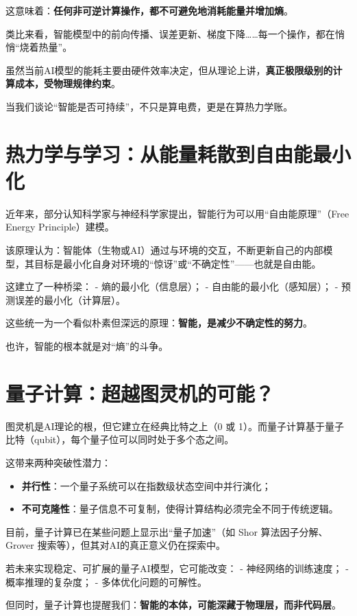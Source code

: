 这意味着：\textbf{任何非可逆计算操作，都不可避免地消耗能量并增加熵}。

类比来看，智能模型中的前向传播、误差更新、梯度下降……每一个操作，都在悄悄“烧着热量”。

虽然当前AI模型的能耗主要由硬件效率决定，但从理论上讲，\textbf{真正极限级别的计算成本，受物理规律约束}。

当我们谈论“智能是否可持续”，不只是算电费，更是在算热力学账。

\section*{热力学与学习：从能量耗散到自由能最小化}

近年来，部分认知科学家与神经科学家提出，智能行为可以用“自由能原理”（Free Energy Principle）建模。

该原理认为：智能体（生物或AI）通过与环境的交互，不断更新自己的内部模型，其目标是最小化自身对环境的“惊讶”或“不确定性”——也就是自由能。

这建立了一种桥梁：
- 熵的最小化（信息层）；
- 自由能的最小化（感知层）；
- 预测误差的最小化（计算层）。

这些统一为一个看似朴素但深远的原理：\textbf{智能，是减少不确定性的努力}。

也许，智能的根本就是对“熵”的斗争。

\section*{量子计算：超越图灵机的可能？}

图灵机是AI理论的根，但它建立在经典比特之上（0 或 1）。而量子计算基于量子比特（qubit），每个量子位可以同时处于多个态之间。

这带来两种突破性潜力：

\begin{itemize}
\item \textbf{并行性}：一个量子系统可以在指数级状态空间中并行演化；
\item \textbf{不可克隆性}：量子信息不可复制，使得计算结构必须完全不同于传统逻辑。
\end{itemize}

目前，量子计算已在某些问题上显示出“量子加速”（如 Shor 算法因子分解、Grover 搜索等），但其对AI的真正意义仍在探索中。

若未来实现稳定、可扩展的量子AI模型，它可能改变：
- 神经网络的训练速度；
- 概率推理的复杂度；
- 多体优化问题的可解性。

但同时，量子计算也提醒我们：\textbf{智能的本体，可能深藏于物理层，而非代码层}。

